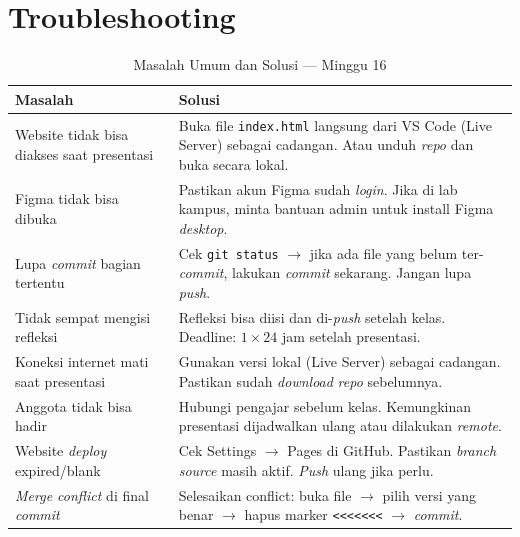 \section{Troubleshooting}
\label{sec:troubleshooting-16}

\begin{table}[htbp]
\centering
\caption{Masalah Umum dan Solusi --- Minggu 16}
\label{tab:troubleshooting-16}
\small
\begin{tabular}{@{}p{5.5cm}p{8cm}@{}}
\toprule
\textbf{Masalah} & \textbf{Solusi} \\
\midrule
Website tidak bisa diakses saat presentasi & Buka file \texttt{index.html} langsung dari VS Code (Live Server) sebagai cadangan. Atau unduh \emph{repo} dan buka secara lokal. \\
Figma tidak bisa dibuka & Pastikan akun Figma sudah \emph{login}. Jika di lab kampus, minta bantuan admin untuk install Figma \emph{desktop}. \\
Lupa \emph{commit} bagian tertentu & Cek \texttt{git status} $\rightarrow$ jika ada file yang belum ter-\emph{commit}, lakukan \emph{commit} sekarang. Jangan lupa \emph{push}. \\
Tidak sempat mengisi refleksi & Refleksi bisa diisi dan di-\emph{push} setelah kelas. Deadline: $1\times24$ jam setelah presentasi. \\
Koneksi internet mati saat presentasi & Gunakan versi lokal (Live Server) sebagai cadangan. Pastikan sudah \emph{download} \emph{repo} sebelumnya. \\
Anggota tidak bisa hadir & Hubungi pengajar sebelum kelas. Kemungkinan presentasi dijadwalkan ulang atau dilakukan \emph{remote}. \\
Website \emph{deploy} expired/blank & Cek Settings $\rightarrow$ Pages di GitHub. Pastikan \emph{branch source} masih aktif. \emph{Push} ulang jika perlu. \\
\emph{Merge conflict} di final \emph{commit} & Selesaikan conflict: buka file $\rightarrow$ pilih versi yang benar $\rightarrow$ hapus marker \texttt{<<<<<<<} $\rightarrow$ \emph{commit}. \\
\bottomrule
\end{tabular}
\end{table}

